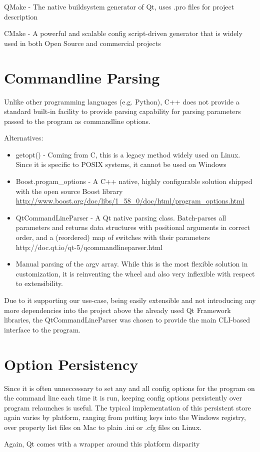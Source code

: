 QMake - The native buildsystem generator of Qt, uses .pro files for project description

CMake - A powerful and scalable config script-driven generator that is widely used in both Open Source and commercial projects 


\section{Commandline Parsing}
Unlike other programming languages (e.g. Python), C++ does not provide a standard built-in facility to provide parsing capability for parsing parameters passed to the program as commandline options.

Alternatives:

\begin{itemize}
\item getopt() - Coming from C, this is a legacy method widely used on Linux. Since it is specific to POSIX systems, it cannot be used on Windows 
\item Boost.progam\_options - A C++ native, highly configurable solution shipped with the open source Boost library
\url{http://www.boost.org/doc/libs/1\_58\_0/doc/html/program\_options.html}
\item QtCommandLineParser - A Qt native parsing class. Batch-parses all parameters and returns data structures with positional arguments in correct order, and a (reordered) map of switches with their parameters
http://doc.qt.io/qt-5/qcommandlineparser.html
\item Manual parsing of the argv array. While this is the most flexible solution in customization, it is reinventing the wheel and also very inflexible with respect to extensibility.
\end{itemize}

Due to it supporting our use-case, being easily extensible and not introducing any more dependencies into the project above the already used Qt Framework libraries, the QtCommandLineParser was chosen to provide the main CLI-based interface to the program.


\section{Option Persistency}
Since it is often unneccessary to set any and all config options for the program on the command line each time it is run, keeping config options persistently over program relaunches is useful. The typical implementation of this persistent store again varies by platform, ranging from putting keys into the Windows registry, over property list files on Mac to plain .ini or .cfg files on Linux.

Again, Qt comes with a wrapper around this platform disparity
